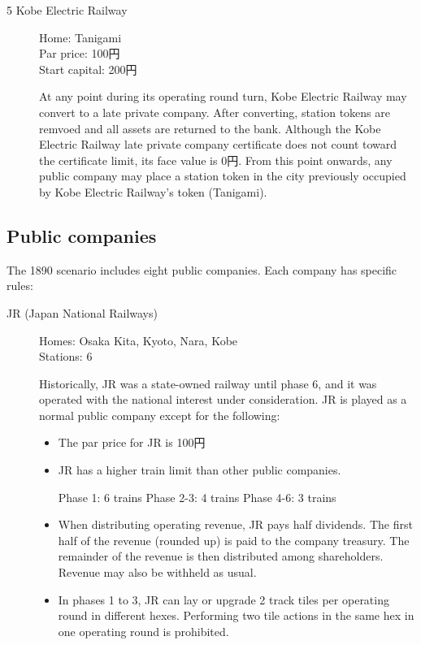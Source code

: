 \documentclass{article}
\begin{document}
\begin{CJK}{UTF8}{min}
\begin{multicols}{2}
\begin{description}
\item[5 Kobe Electric Railway]\hfill

  Home: Tanigami \\
  Par price: 100円 \\
  Start capital: 200円

  At any point during its operating round turn, Kobe Electric Railway
  may convert to a late private company. After converting, station
  tokens are remvoed and all assets are returned to the bank. Although
  the Kobe Electric Railway late private company certificate does not
  count toward the certificate limit, its face value is 0円. From
  this point onwards, any public company may place a station token in
  the city previously occupied by Kobe Electric Railway's token
  (Tanigami).
\end{description}

\subsection{Public companies}

The 1890 scenario includes eight public companies. Each company has
specific rules:

\begin{description}
\item[JR (Japan National Railways)] \hfill

Homes: Osaka Kita, Kyoto, Nara, Kobe \\
Stations: 6

Historically, JR was a state-owned railway until phase 6, and it was
operated with the national interest under consideration. JR is played
as a normal public company except for the following:
\begin{itemize}
\item The par price for JR is 100円

\item JR has a higher train limit than other public companies.

Phase 1: 6 trains
Phase 2-3: 4 trains
Phase 4-6: 3 trains

\item When distributing operating revenue, JR pays half
  dividends. The first half of the revenue (rounded up) is paid to the
  company treasury. The remainder of the revenue is then distributed
  among shareholders. Revenue may also be withheld as usual.

\item In phases 1 to 3, JR can lay or upgrade 2 track tiles per
  operating round in different hexes. Performing two tile actions in
  the same hex in one operating round is prohibited.
\end{itemize}


\end{description}
\end{multicols}
\end{CJK}
\end{document}
